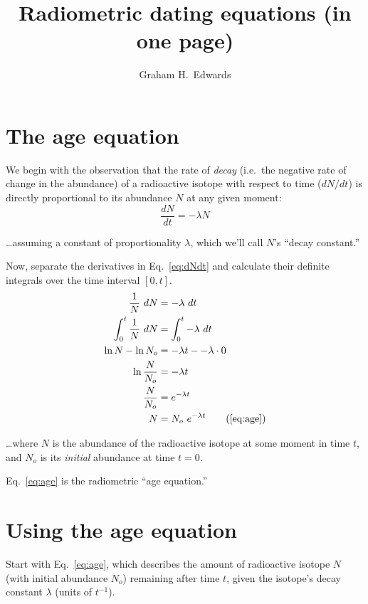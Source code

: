 \documentclass[12pt, letterpaper,twocolumn]{article}
\title{Radiometric dating equations (in one page) \vspace*{-2ex}}
\author{Graham H.~Edwards}
\date{\vspace*{-6ex}}
\begin{document}
\maketitle \thispagestyle{empty}
\addtolength{\jot}{1ex}

\section{The age equation}
We begin with the observation that the rate of \emph{decay} (i.e.~the negative rate of change in the abundance) of a radioactive isotope with respect to time ($dN/dt$) is directly proportional to its abundance $N$ at any given moment:
\begin{equation}\label{eq:dNdt}
    \frac{dN}{dt} = -\lambda N
\end{equation}

\dots assuming a constant of proportionality $\lambda$, which we'll call $N$'s ``decay constant.''

Now, separate the derivatives in Eq.~\ref{eq:dNdt} and calculate their definite integrals over the time interval $\left[0,t\right]$.
\begin{subequations}\label{eq:age}
    \begin{align*}
        \frac{1}{N}~dN &= -\lambda~dt
        \\
        \int_0^t \frac{1}{N}~dN & = \int_0^t -\lambda~dt
        \\
        \ln N - \ln N_o &= -\lambda t - -\lambda \cdot 0
        \\
        \ln \frac{N}{N_o} &= -\lambda t
        \\
        \frac{N}{N_o} &= e^{-\lambda t}
        \\
        N &= N_o~e^{-\lambda t} \tag{\ref{eq:age}}
    \end{align*}
\end{subequations}

\dots where $N$ is the abundance of the radioactive isotope at some moment in time $t$, and $N_o$ is its \emph{initial} abundance at time $t=0$.

Eq.~\ref{eq:age} is the radiometric ``age equation.''

\section{Using the age equation}
Start with Eq.~\ref{eq:age}, which describes the amount of radioactive isotope $N$ (with initial abundance $N_o$) remaining after time $t$, given the isotope's decay constant $\lambda$ (units of $t^{-1}$).
\end{document}
